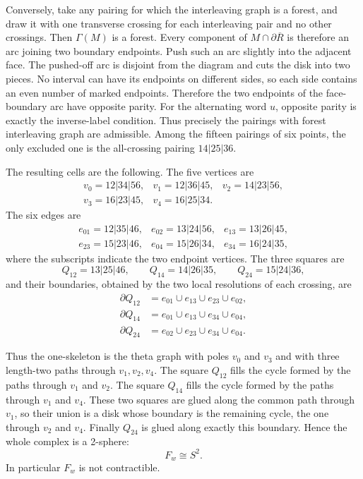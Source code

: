 \documentclass[12pt]{article}
\begin{document}
Conversely, take any pairing for which the interleaving graph is a
forest, and draw it with one transverse crossing for each interleaving
pair and no other crossings.  Then \(\Gamma(M)\) is a forest.  Every
component of \(M\cap\partial\overline R\) is therefore an arc joining
two boundary endpoints.  Push such an arc slightly into the adjacent
face.  The pushed-off arc is disjoint from the diagram and cuts the disk
into two pieces.  No interval can have its endpoints on different sides,
so each side contains an even number of marked endpoints.  Therefore
the two endpoints of the face-boundary arc have opposite parity.  For
the alternating word \(u\), opposite parity is exactly the inverse-label
condition.  Thus precisely the pairings with forest interleaving graph
are admissible.  Among the fifteen pairings of six points, the only
excluded one is the all-crossing pairing \(14|25|36\).

The resulting cells are the following.  The five vertices are
\[
\begin{array}{lll}
v_0=12|34|56, & v_1=12|36|45, & v_2=14|23|56,\\
v_3=16|23|45, & v_4=16|25|34. &
\end{array}
\]
The six edges are
\[
\begin{array}{lll}
e_{01}=12|35|46, & e_{02}=13|24|56, & e_{13}=13|26|45,\\
e_{23}=15|23|46, & e_{04}=15|26|34, & e_{34}=16|24|35,
\end{array}
\]
where the subscripts indicate the two endpoint vertices.  The three
squares are
\[
        Q_{12}=13|25|46,\qquad
        Q_{14}=14|26|35,\qquad
        Q_{24}=15|24|36,
\]
and their boundaries, obtained by the two local resolutions of each
crossing, are
\[
\begin{aligned}
\partial Q_{12}&=e_{01}\cup e_{13}\cup e_{23}\cup e_{02},\\
\partial Q_{14}&=e_{01}\cup e_{13}\cup e_{34}\cup e_{04},\\
\partial Q_{24}&=e_{02}\cup e_{23}\cup e_{34}\cup e_{04}.
\end{aligned}
\]

Thus the one-skeleton is the theta graph with poles \(v_0\) and \(v_3\)
and with three length-two paths through \(v_1,v_2,v_4\).  The square
\(Q_{12}\) fills the cycle formed by the paths through \(v_1\) and
\(v_2\).  The square \(Q_{14}\) fills the cycle formed by the paths
through \(v_1\) and \(v_4\).  These two squares are glued along the
common path through \(v_1\), so their union is a disk whose boundary is
the remaining cycle, the one through \(v_2\) and \(v_4\).  Finally
\(Q_{24}\) is glued along exactly this boundary.  Hence the whole
complex is a 2-sphere:
\[
        F_w \cong S^2 .
\]
In particular \(F_w\) is not contractible.
\end{document}
